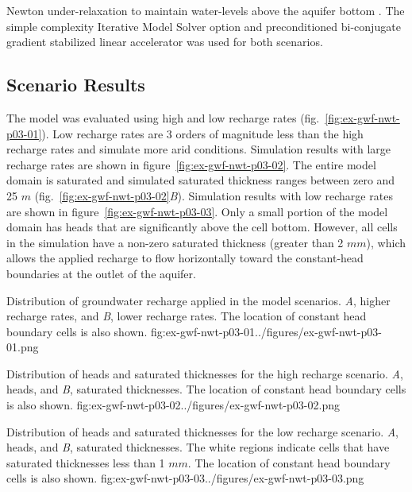 Newton under-relaxation to maintain water-levels above the aquifer bottom \citep{modflow6framework}. The simple complexity Iterative Model Solver option and preconditioned bi-conjugate gradient stabilized linear accelerator was used for both scenarios.

\subsection{Scenario Results}

The model was evaluated using high and low recharge rates (fig.~\ref{fig:ex-gwf-nwt-p03-01}). Low recharge rates are 3 orders of magnitude less than the high recharge rates and simulate more arid conditions. Simulation results with large recharge rates are shown in figure~\ref{fig:ex-gwf-nwt-p03-02}. The entire model domain is saturated and simulated saturated thickness ranges between zero and 25 $m$ (fig.~\ref{fig:ex-gwf-nwt-p03-02}\textit{B}). Simulation results with low recharge rates are shown in figure~\ref{fig:ex-gwf-nwt-p03-03}. Only a small portion of the model domain has heads that are significantly above the cell bottom. However, all cells in the simulation have a non-zero saturated thickness (greater than 2 $mm$), which allows the applied recharge to flow horizontally toward the constant-head boundaries at the outlet of the aquifer.

\begin{StandardFigure}{
                                      Distribution of groundwater recharge applied in the model scenarios.  
                                      \textit{A}, higher recharge rates, and \textit{B}, lower recharge rates. 
                                      The location of constant head boundary cells is also shown.
                                     }{fig:ex-gwf-nwt-p03-01}{../figures/ex-gwf-nwt-p03-01.png}
\end{StandardFigure} 

\begin{StandardFigure}{
                                      Distribution of heads and saturated thicknesses for the high recharge
                                      scenario. \textit{A}, heads, and \textit{B}, saturated thicknesses.
                                      The location of constant head boundary cells is also shown.
                                     }{fig:ex-gwf-nwt-p03-02}{../figures/ex-gwf-nwt-p03-02.png}
\end{StandardFigure} 



\begin{StandardFigure}{
                                      Distribution of heads and saturated thicknesses for the low recharge
                                      scenario. \textit{A}, heads, and \textit{B}, saturated thicknesses.
                                      The white regions indicate cells that have saturated thicknesses less
                                      than 1 $mm$. The location of constant head boundary cells is also shown.
                                     }{fig:ex-gwf-nwt-p03-03}{../figures/ex-gwf-nwt-p03-03.png}
\end{StandardFigure} 

